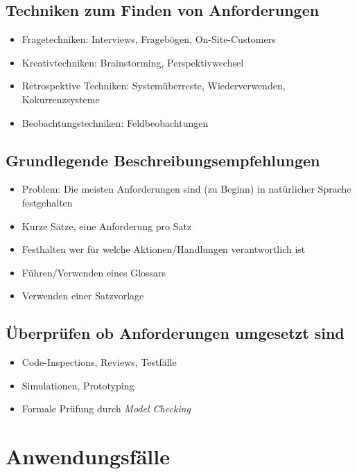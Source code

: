 \subsection{Techniken zum Finden von Anforderungen}
\begin{itemize}
	\item Fragetechniken: Interviews, Fragebögen, On-Site-Customers
	\item Kreativtechniken: Brainstorming, Perspektivwechsel
	\item Retrospektive Techniken: Systemüberreste, Wiederverwenden, Kokurrenzsysteme
	\item Beobachtungstechniken: Feldbeobachtungen
\end{itemize}


\subsection{Grundlegende Beschreibungsempfehlungen}
\begin{itemize}
	\item Problem: Die meisten Anforderungen sind (zu Beginn) in natürlicher Sprache festgehalten
	\item Kurze Sätze, eine Anforderung pro Satz
	\item Festhalten wer für welche Aktionen/Handlungen verantwortlich ist
	\item Führen/Verwenden eines Glossars
	\item Verwenden einer Satzvorlage
\end{itemize}


\subsection{Überprüfen ob Anforderungen umgesetzt sind}
\begin{itemize}
	\item Code-Inspections, Reviews, Testfälle
	\item Simulationen, Prototyping
	\item Formale Prüfung durch \textit{Model Checking}
\end{itemize}



\section{Anwendungsfälle}

